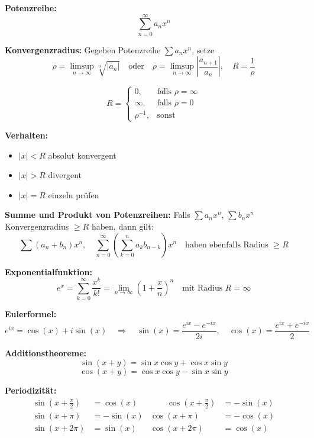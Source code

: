 \textbf{Potenzreihe:}  
\[
\sum_{n=0}^\infty a_n x^n
\]

\textbf{Konvergenzradius:}  
Gegeben Potenzreihe \( \sum a_n x^n \), setze
\[
\rho = \limsup_{n \to \infty} \sqrt[n]{|a_n|} \quad \text{oder} \quad
\rho = \limsup_{n \to \infty} \left| \frac{a_{n+1}}{a_n} \right|, \quad
R = \frac{1}{\rho}
\]

\[
R =
\begin{cases}
0, & \text{falls } \rho = \infty \\
\infty, & \text{falls } \rho = 0 \\
\rho^{-1}, & \text{sonst}
\end{cases}
\]

\textbf{Verhalten:}
\begin{itemize}
  \item \( |x| < R \) \quad absolut konvergent
  \item \( |x| > R \) \quad divergent
  \item \( |x| = R \) \quad einzeln prüfen
\end{itemize}

\vspace{0.5em}

\textbf{Summe und Produkt von Potenzreihen:}  
Falls \( \sum a_n x^n \), \( \sum b_n x^n \) Konvergenzradius \( \geq R \) haben, dann gilt:
\[
\sum (a_n + b_n)x^n, \quad
\sum_{n=0}^\infty \left( \sum_{k=0}^n a_k b_{n-k} \right) x^n
\quad \text{haben ebenfalls Radius } \geq R
\]

\vspace{0.5em}

\textbf{Exponentialfunktion:}
\[
e^x = \sum_{k=0}^\infty \frac{x^k}{k!} = \lim_{n \to \infty} \left(1 + \frac{x}{n}\right)^n
\quad \text{mit Radius } R = \infty
\]

\textbf{Eulerformel:}  
\[
e^{ix} = \cos(x) + i \sin(x)
\quad\Rightarrow\quad
\sin(x) = \frac{e^{ix} - e^{-ix}}{2i},\quad
\cos(x) = \frac{e^{ix} + e^{-ix}}{2}
\]

\textbf{Additionstheoreme:}  
\[
\sin(x + y) = \sin x \cos y + \cos x \sin y
\]
\[
\cos(x + y) = \cos x \cos y - \sin x \sin y
\]

\textbf{Periodizität:}
\[
\begin{aligned}
\sin(x + \tfrac{\pi}{2}) &= \cos(x) & \qquad \cos(x + \tfrac{\pi}{2}) &= -\sin(x) \\
\sin(x + \pi) &= -\sin(x) & \cos(x + \pi) &= -\cos(x) \\
\sin(x + 2\pi) &= \sin(x) & \cos(x + 2\pi) &= \cos(x)
\end{aligned}
\]

